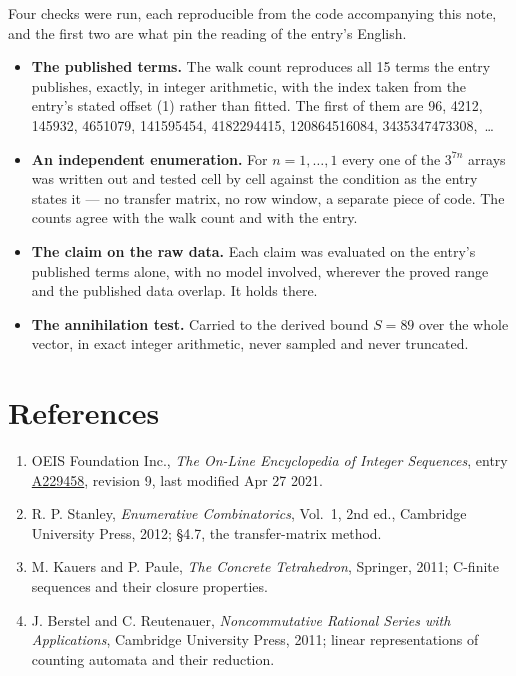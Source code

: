 \documentclass[11pt]{article}
\theoremstyle{definition}
\begin{document}
Four checks were run, each reproducible from the code accompanying this note, and the first two are what pin the reading of the entry's English.

\begin{itemize}

\item {\bfseries The published terms.} The walk count reproduces all 15 terms the entry publishes, exactly, in integer arithmetic, with the index taken from the entry's stated offset (1) rather than fitted. The first of them are 96, 4212, 145932, 4651079, 141595454, 4182294415, 120864516084, 3435347473308,~\dots

\item {\bfseries An independent enumeration.} For $n = 1,\dots,1$ every one of the $3^{7n}$ arrays was written out and tested cell by cell against the condition as the entry states it --- no transfer matrix, no row window, a separate piece of code. The counts agree with the walk count and with the entry.

\item {\bfseries The claim on the raw data.} Each claim was evaluated on the entry's published terms alone, with no model involved, wherever the proved range and the published data overlap. It holds there.

\item {\bfseries The annihilation test.} Carried to the derived bound $S = 89$ over the whole vector, in exact integer arithmetic, never sampled and never truncated.

\end{itemize}

\section{References}

\begin{enumerate}

\item OEIS Foundation Inc., \emph{The On-Line Encyclopedia of Integer Sequences}, entry \href{https://oeis.org/A229458}{A229458}, revision 9, last modified Apr 27 2021.

\item R. P. Stanley, \emph{Enumerative Combinatorics}, Vol.~1, 2nd ed., Cambridge University Press, 2012; \S4.7, the transfer-matrix method.

\item M. Kauers and P. Paule, \emph{The Concrete Tetrahedron}, Springer, 2011; C-finite sequences and their closure properties.

\item J. Berstel and C. Reutenauer, \emph{Noncommutative Rational Series with Applications}, Cambridge University Press, 2011; linear representations of counting automata and their reduction.

\end{enumerate}
\end{document}
